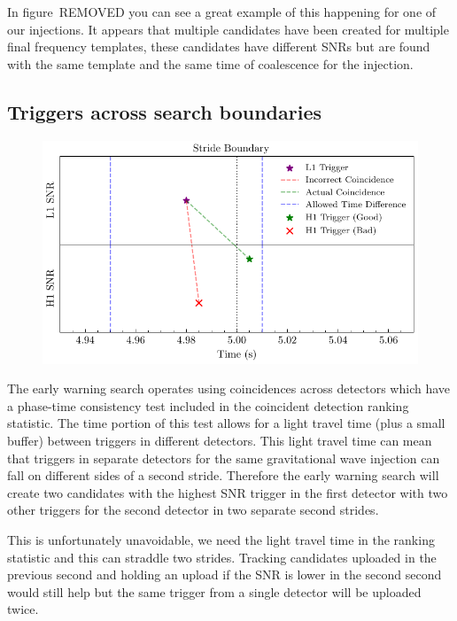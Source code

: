 In figure~REMOVED you can see a great example of this happening for one of our injections. It appears that multiple candidates have been created for multiple final frequency templates, these candidates have different SNRs but are found with the same template and the same time of coalescence for the injection.

\subsection{Triggers across search boundaries}
%
\begin{figure}
       \centering
    \includegraphics[width=\textwidth]{images/6_earlywarning/identified-problems/trigs_across_bounds.pdf}
    \caption{}
    \label{6:fig:triggers_across_boundaries}
\end{figure}
%
The early warning search operates using coincidences across detectors which have a phase-time consistency test included in the coincident detection ranking statistic. The time portion of this test allows for a light travel time (plus a small buffer) between triggers in different detectors. This light travel time can mean that triggers in separate detectors for the same gravitational wave injection can fall on different sides of a second stride. Therefore the early warning search will create two candidates with the highest SNR trigger in the first detector with two other triggers for the second detector in two separate second strides.

This is unfortunately unavoidable, we need the light travel time in the ranking statistic and this can straddle two strides. Tracking candidates uploaded in the previous second and holding an upload if the SNR is lower in the second second would still help but the same trigger from a single detector will be uploaded twice.

